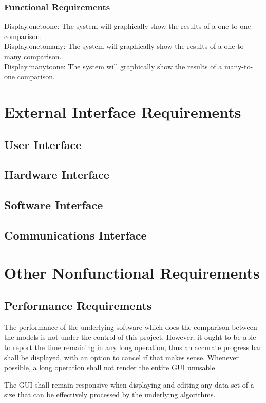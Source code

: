 \documentclass{article}
\begin{document}
\subsubsection{Functional Requirements}
Display.onetoone: The system will graphically show the results of a one-to-one comparison.\\
Display.onetomany: The system will graphically show the results of a one-to-many comparison.\\
Display.manytoone: The system will graphically show the results of a many-to-one comparison.

\section{External Interface Requirements}
\subsection{User Interface}
\subsection{Hardware Interface}
\subsection{Software Interface}
\subsection{Communications Interface}

\section{Other Nonfunctional Requirements}
\subsection{Performance Requirements}
The performance of the underlying software which does the comparison between the models is not under the control of this project. However, it ought to be able to report the time remaining in any long operation, thus an accurate progress bar shall be displayed, with an option to cancel if that makes sense. Whenever possible, a long operation shall not render the entire GUI unusable.

The GUI shall remain responsive when displaying and editing any data set of a size that can be effectively processed by the underlying algorithms.
\end{document}
